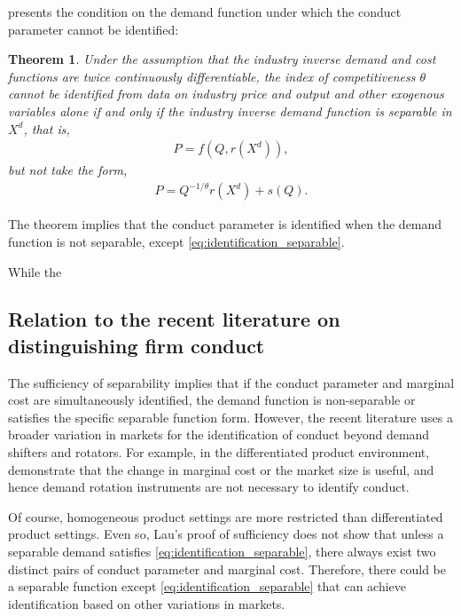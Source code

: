 \documentclass[11pt, a4paper]{article}
\newtheorem{theorem}{Theorem}
\theoremstyle{remark}
\begin{document}
\citet{lau1982identifying} presents the condition on the demand function under which the conduct parameter cannot be identified:
\begin{theorem}\label{theorem_lau}
    Under the assumption that the industry inverse demand and cost functions are twice continuously differentiable, the index of competitiveness $\theta$ cannot be identified from data on industry price and output and other exogenous variables alone if and only if the industry inverse demand function is separable in $X^{d}$, that is,
    \begin{align}
        P = f(Q, r(X^{d})), \label{eq:demand_separable}
    \end{align}
    but not take the form, 
    \begin{align}
        P = Q^{-1/\theta}r(X^{d}) + s(Q). \label{eq:identification_separable}
    \end{align}
\end{theorem}
The theorem implies that the conduct parameter is identified when the demand function is not separable, except \eqref{eq:identification_separable}.


While the 





\subsection{Relation to the recent literature on distinguishing firm conduct}

The sufficiency of separability implies that if the conduct parameter and marginal cost are simultaneously identified, the demand function is non-separable or satisfies the specific separable function form.
However, the recent literature uses a broader variation in markets for the identification of conduct beyond demand shifters and rotators.
For example, in the differentiated product environment, \citet{berry2014identification} demonstrate that the change in marginal cost or the market size is useful, and hence demand rotation instruments are not necessary to identify conduct.

Of course, homogeneous product settings are more restricted than differentiated product settings.
Even so, Lau's proof of sufficiency does not show that unless a separable demand satisfies  \eqref{eq:identification_separable}, there always exist two distinct pairs of conduct parameter and marginal cost.
Therefore, there could be a separable function except \eqref{eq:identification_separable} that can achieve identification based on other variations in markets.
\end{document}
